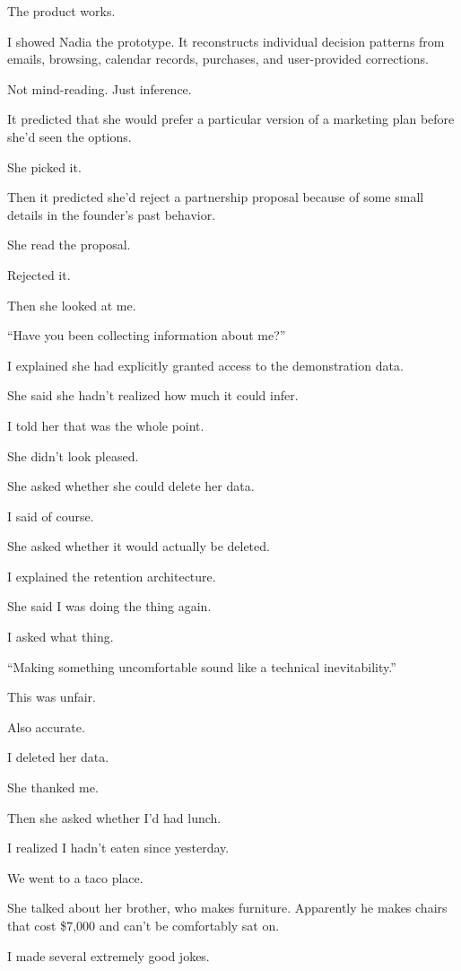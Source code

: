 \documentclass[11pt,oneside]{book}
\begin{document}
The product works.

I showed Nadia the prototype. It reconstructs individual decision patterns from emails, browsing, calendar records, purchases, and user-provided corrections.

Not mind-reading. Just inference.

It predicted that she would prefer a particular version of a marketing plan before she'd seen the options.

She picked it.

Then it predicted she'd reject a partnership proposal because of some small details in the founder's past behavior.

She read the proposal.

Rejected it.

Then she looked at me.

``Have you been collecting information about me?''

I explained she had explicitly granted access to the demonstration data.

She said she hadn't realized how much it could infer.

I told her that was the whole point.

She didn't look pleased.

She asked whether she could delete her data.

I said of course.

She asked whether it would actually be deleted.

I explained the retention architecture.

She said I was doing the thing again.

I asked what thing.

``Making something uncomfortable sound like a technical inevitability.''

This was unfair.

Also accurate.

I deleted her data.

She thanked me.

Then she asked whether I'd had lunch.

I realized I hadn't eaten since yesterday.

We went to a taco place.

She talked about her brother, who makes furniture. Apparently he makes chairs that cost \$7,000 and can't be comfortably sat on.

I made several extremely good jokes.
\end{document}
